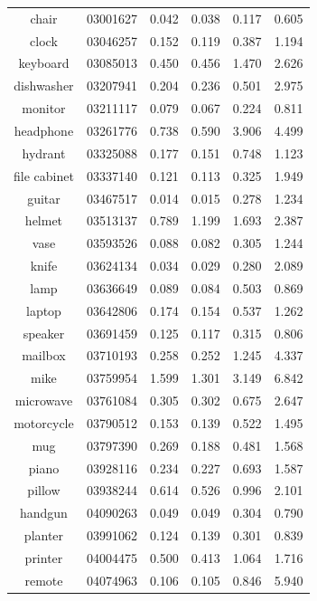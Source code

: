 \begin{table}
\begin{tabular}{c c c c c c}
		chair & 03001627 & 0.042 & 0.038 & 0.117 & 0.605 \\
		clock & 03046257 & 0.152 & 0.119 & 0.387 & 1.194 \\
		keyboard & 03085013 & 0.450 & 0.456 & 1.470 & 2.626\\
		dishwasher & 03207941 & 0.204 & 0.236 & 0.501 & 2.975 \\
		monitor & 03211117 & 0.079 & 0.067 & 0.224 & 0.811\\
		headphone & 03261776 & 0.738 & 0.590 & 3.906 & 4.499 \\
		hydrant & 03325088 & 0.177 & 0.151 & 0.748 & 1.123 \\
		file cabinet& 03337140 & 0.121 & 0.113 & 0.325 & 1.949 \\
		guitar & 03467517 & 0.014 & 0.015 & 0.278 & 1.234 \\
		helmet & 03513137 & 0.789 & 1.199 & 1.693 & 2.387 \\
		vase & 03593526 & 0.088 & 0.082 & 0.305 & 1.244 \\
		knife & 03624134 & 0.034  & 0.029 & 0.280 & 2.089 \\
		lamp & 03636649 & 0.089 & 0.084 & 0.503 & 0.869\\
		laptop & 03642806 & 0.174 & 0.154 & 0.537 & 1.262 \\
		speaker & 03691459 & 0.125 & 0.117 & 0.315 & 0.806 \\
		mailbox & 03710193 & 0.258 & 0.252 & 1.245 & 4.337 \\
		mike & 03759954 & 1.599 & 1.301 & 3.149 & 6.842 \\
		microwave & 03761084 & 0.305 & 0.302 & 0.675 & 2.647 \\
		motorcycle & 03790512 & 0.153 & 0.139 & 0.522 & 1.495\\
		mug & 03797390 & 0.269 & 0.188 & 0.481 & 1.568 \\
		piano & 03928116 & 0.234 & 0.227 & 0.693 & 1.587 \\
		pillow & 03938244 & 0.614 & 0.526 & 0.996 & 2.101 \\
		handgun & 04090263 & 0.049 & 0.049 & 0.304 & 0.790 \\	
		planter & 03991062 & 0.124 & 0.139 & 0.301 & 0.839 \\
		printer & 04004475 & 0.500 & 0.413 & 1.064 & 1.716 \\
		remote & 04074963 & 0.106 & 0.105 & 0.846 & 5.940 \\

\end{tabular}
\end{table}
